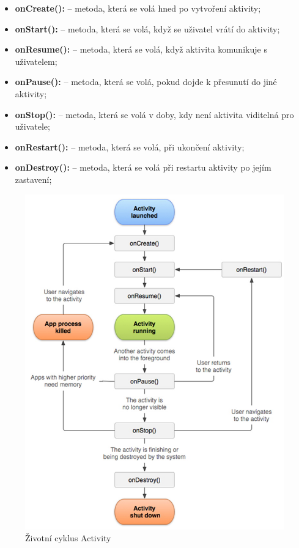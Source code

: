 \documentclass{vskpou} %
\begin{document}
\begin{itemize}
        \begin{itemize}
        \item \textbf{onCreate():} -- metoda, která se volá hned po vytvoření aktivity;
        \item \textbf{onStart():} -- metoda, která se volá, když se uživatel vrátí do aktivity;
        \item \textbf{onResume():} -- metoda, která se volá, když aktivita komunikuje s uživatelem;
        \item \textbf{onPause():} -- metoda, která se volá, pokud dojde k přesunutí do jiné aktivity; 
        \item \textbf{onStop():} -- metoda, která se volá v doby, kdy není aktivita viditelná pro uživatele; 
        \item \textbf{onRestart():} -- metoda, která se volá, při ukončení aktivity;
        \item \textbf{onDestroy():} -- metoda, která se volá při restartu aktivity po jejím zastavení; 
        \end{itemize}
        
        \begin{figure}[h!]
        \centering
        \includegraphics[scale=0.3]{images/25.jpg}
        \caption{Životní cyklus Activity}
        \label{25}
        \end{figure}
    

\end{itemize}
\end{document}
